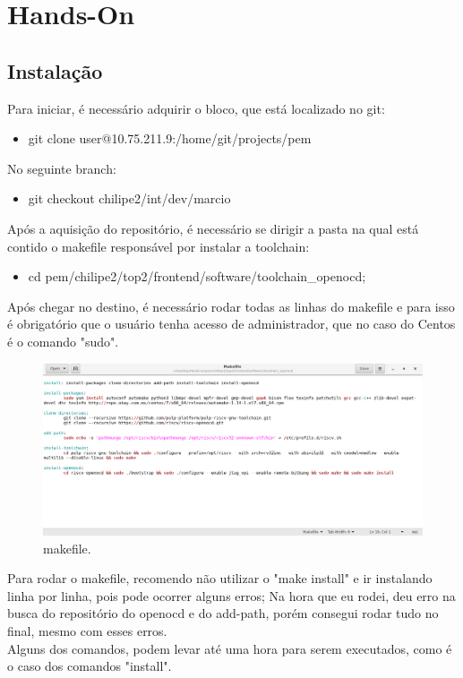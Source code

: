 \section{Hands-On} %
\label{sec:handson}
\subsection{Instalação}
Para iniciar, é necessário adquirir o bloco, que está localizado no git:
\begin{itemize}
  \item git clone user@10.75.211.9:/home/git/projects/pem
\end{itemize}
No seguinte branch:
\begin{itemize}
  \item git checkout chilipe2/int/dev/marcio
\end{itemize}


Após a aquisição do repositório, é necessário se dirigir a pasta na qual está contido o makefile responsável por instalar a toolchain:
\begin{itemize}
  \item cd pem/chilipe2/top2/frontend/software/toolchain\_openocd;
\end{itemize}
Após chegar no destino, é necessário rodar todas as linhas do makefile e para isso é obrigatório que o usuário tenha acesso de administrador, que no caso do Centos é o comando "sudo".
\begin{figure}[H]
  \includegraphics[width=\linewidth]{diagrams/makefile1.png}
  \caption{makefile.}
  \label{fig:top}
\end{figure}
Para rodar o makefile, recomendo não utilizar o "make install" e ir instalando linha por linha, pois pode ocorrer alguns erros; Na hora que eu rodei, deu erro na busca do repositório do openocd e do add-path, porém consegui rodar tudo no final, mesmo com esses erros.
\\	
Alguns dos comandos, podem levar até uma hora para serem executados, como é o caso dos comandos "install".


